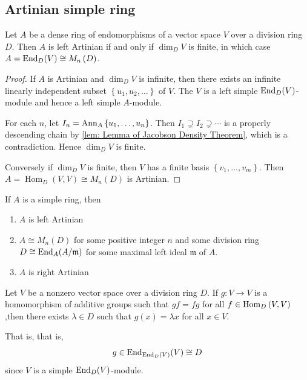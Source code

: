 \subsection{Artinian simple ring}%
\begin{lemma}
    \label{lem: Dense ring of endomorphisms of a finite dimensional vector space}
    Let $A$ be a dense ring of endomorphisms of a vector space $V$ over a division ring $D$.
    Then $A$ is left Artinian if and only if $\operatorname{dim}_{D} V$ is finite, in which case $A=\operatorname{\operatorname{End}}_D(V) \cong M_n\left(D\right)$.

    \begin{proof}
        If $A$ is Artinian and $\operatorname{dim}_D V$ is infinite, then there exists an infinite linearly independent subset $\left\{u_1, u_2, \ldots\right\}$ of $V$.
        The $V$ is a left simple $\operatorname{\operatorname{End}}_D(V)$-module and hence a left simple $A$-module.

        For each $n$, let $I_n=\operatorname{\operatorname{Ann}}_{A}\left\{u_1, \ldots, u_n\right\}$.
        Then $I_1\supsetneq I_2\supsetneq\cdots$ is a properly descending chain by \cref{lem: Lemma of Jacobson Density Theorem}, which is a contradiction. Hence $\dim_D V$ is finite.

        Conversely if $\operatorname{dim}_D V$ is finite, then $V$ has a finite basis $\left\{v_1, \ldots, v_m\right\}$. Then $A= \operatorname{Hom}_D(V, V)\cong M_n\left(D\right) $ is Artinian.
    \end{proof}
\end{lemma}


\begin{corollary}
    If $A$ is a simple ring, then
    \begin{enumerate}
        \item
              $A$ is left Artinian
        \item
              $A\cong M_n\left(D\right)$ for some positive integer $n$ and some division ring $D\cong \operatorname{\operatorname{End}}_A(A/\mathfrak{m})$ for some maximal left ideal $\mathfrak{m}$ of $A$.
        \item
              $A$ is right Artinian
    \end{enumerate}
\end{corollary}




\begin{lemma}
    \label{lem: Schur's lemma for endomorphism ring}
    Let $V$ be a nonzero vector space over a division ring $D$.
    If $g: V \rightarrow V$ is a homomorphism of additive groups such that $gf=fg$ for all $f \in \operatorname{\operatorname{Hom}}_{D}\left( V,V \right)$,then there exists $\lambda \in D$ such that $g(x)=\lambda x$ for all $x\in V$.
    \begin{remark}
        That is, that is,
        \begin{equation*}
            g\in \operatorname{\operatorname{End}}_{\operatorname{\operatorname{End}}_D(V)}(V)\cong D
        \end{equation*}
        since $V$ is a simple $\operatorname{\operatorname{End}}_D(V)$-module.
    \end{remark}
\end{lemma}

